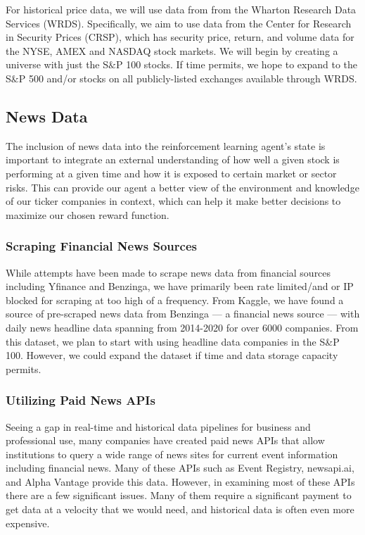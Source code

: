 For historical price data, we will use data from from the Wharton Research Data Services 
(WRDS). Specifically, we aim to use data from the Center for Research in 
Security Prices (CRSP), which has security price, return, and volume data for the 
NYSE, AMEX and NASDAQ stock markets.  We will begin by creating a universe with just the S$\&$P 100 stocks.
If time permits, we hope to expand to the S$\&$P 500 and/or stocks on all publicly-listed exchanges available through WRDS.

\subsection{News Data}

The inclusion of news data into the reinforcement learning agent’s 
state is important to integrate an external understanding of how 
well a given stock is performing at a given time and how it is
exposed to certain market or sector risks. This can provide our agent a better 
view of the environment and knowledge of our ticker companies in context, which 
can help it make better decisions to maximize our chosen reward function.


\subsubsection{Scraping Financial News Sources}

While attempts have been made to scrape news data from financial sources including Yfinance and Benzinga,
we have primarily been rate limited/and or IP blocked for scraping at too high of a frequency.
From Kaggle, we have found a source of pre-scraped news data from Benzinga — a financial news source — with daily news
headline data spanning from 2014-2020 for over 6000 companies. From this dataset,
we plan to start with using headline data companies in the S\&P 100.
However, we could expand the dataset if time and data storage capacity permits.

\subsubsection{Utilizing Paid News APIs}

Seeing a gap in real-time and historical data pipelines for business and professional 
use, many companies have created paid news APIs that allow institutions to query a 
wide range of news sites for current event information including financial news. 
Many of these APIs such as Event Registry, newsapi.ai, and Alpha Vantage provide 
this data. However, in examining most of these APIs there are a few significant 
issues. Many of them require a significant payment to get data at a velocity 
that we would need, and historical data is often even more expensive. 

